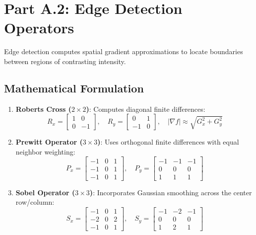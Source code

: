\documentclass[12pt]{article}
\begin{document}
\section{Part A.2: Edge Detection Operators}

Edge detection computes spatial gradient approximations to locate boundaries between regions of contrasting intensity.

\subsection{Mathematical Formulation}
\begin{enumerate}
    \item \textbf{Roberts Cross ($2 \times 2$)}: Computes diagonal finite differences:
    \begin{equation}
    R_x = \begin{bmatrix} 1 & 0 \\ 0 & -1 \end{bmatrix}, \quad R_y = \begin{bmatrix} 0 & 1 \\ -1 & 0 \end{bmatrix}, \quad |\nabla f| \approx \sqrt{G_x^2 + G_y^2}
    \end{equation}
    \item \textbf{Prewitt Operator ($3 \times 3$)}: Uses orthogonal finite differences with equal neighbor weighting:
    \begin{equation}
    P_x = \begin{bmatrix} -1 & 0 & 1 \\ -1 & 0 & 1 \\ -1 & 0 & 1 \end{bmatrix}, \quad P_y = \begin{bmatrix} -1 & -1 & -1 \\ 0 & 0 & 0 \\ 1 & 1 & 1 \end{bmatrix}
    \end{equation}
    \item \textbf{Sobel Operator ($3 \times 3$)}: Incorporates Gaussian smoothing across the center row/column:
    \begin{equation}
    S_x = \begin{bmatrix} -1 & 0 & 1 \\ -2 & 0 & 2 \\ -1 & 0 & 1 \end{bmatrix}, \quad S_y = \begin{bmatrix} -1 & -2 & -1 \\ 0 & 0 & 0 \\ 1 & 2 & 1 \end{bmatrix}

\end{equation}
\end{enumerate}
\end{document}
